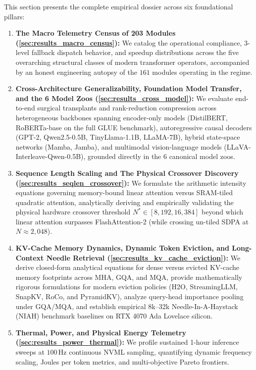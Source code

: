 This section presents the complete empirical dossier across six foundational pillars:
\begin{enumerate}
    \item \textbf{The Macro Telemetry Census of 203 Modules (\cref{sec:results_macro_census}):} We catalog the operational compliance, 3-level fallback dispatch behavior, and speedup distributions across the five overarching structural classes of modern transformer operators, accompanied by an honest engineering autopsy of the $161$ modules operating in the \passslow{} regime.
    \item \textbf{Cross-Architecture Generalizability, Foundation Model Transfer, and the 6 Model Zoos (\cref{sec:results_cross_model}):} We evaluate end-to-end surgical transplants and rank-reduction compression across heterogeneous backbones spanning encoder-only models (DistilBERT, RoBERTa-base on the full GLUE benchmark), autoregressive causal decoders (GPT-2, Qwen2.5-0.5B, TinyLlama-1.1B, LLaMA-7B), hybrid state-space networks (Mamba, Jamba), and multimodal vision-language models (LLaVA-Interleave-Qwen-0.5B), grounded directly in the 6 canonical \neuralops{} model zoos.
    \item \textbf{Sequence Length Scaling and The Physical Crossover Discovery (\cref{sec:results_seqlen_crossover}):} We formulate the arithmetic intensity equations governing memory-bound linear attention versus SRAM-tiled quadratic attention, analytically deriving and empirically validating the physical hardware crossover threshold $N^* \in [8{,}192, 16{,}384]$ beyond which linear attention surpasses FlashAttention-2 (while crossing un-tiled SDPA at $N \approx 2{,}048$).
    \item \textbf{KV-Cache Memory Dynamics, Dynamic Token Eviction, and Long-Context Needle Retrieval (\cref{sec:results_kv_cache_eviction}):} We derive closed-form analytical equations for dense versus evicted KV-cache memory footprints across MHA, GQA, and MQA, provide mathematically rigorous formulations for modern eviction policies (H2O, StreamingLLM, SnapKV, RoCo, and PyramidKV), analyze query-head importance pooling under GQA/MQA, and establish empirical 8k--32k Needle-In-A-Haystack (NIAH) benchmark baselines on RTX 4070 Ada Lovelace silicon.
    \item \textbf{Thermal, Power, and Physical Energy Telemetry (\cref{sec:results_power_thermal}):} We profile sustained 1-hour inference sweeps at $100\,\text{Hz}$ continuous NVML sampling, quantifying dynamic frequency scaling, Joules per token metrics, and multi-objective Pareto frontiers.
\end{enumerate}

